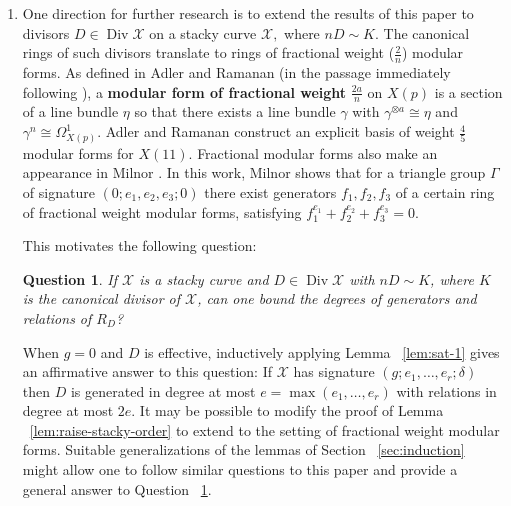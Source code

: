 \documentclass{amsart}
\theoremstyle{plain}
\newtheorem{question}[thm]{Question}
\theoremstyle{definition}
\theoremstyle{remark}
\numberwithin{equation}{section}
\DeclareMathOperator\di{Div}
\newcommand\sx{\mathscr X}
\begin{document}
\begin{enumerate}
	\item One direction for further research is to 
		extend the results of this paper to divisors $D \in \di \sx$ on a 
		stacky curve $\sx,$ where $nD \sim K.$ The canonical rings of such 
		divisors translate to rings of fractional weight ($\frac{2}{n}$) modular 
		forms. As defined in Adler and Ramanan (in the passage immediately 
		following \cite[Corollary 24.5]{adler:moduli}), a {\bf modular form 
		of fractional weight} $\frac{2a}{n}$ on $X(p)$ is a section of a 
		line bundle $\eta$ so that there exists a line bundle $\gamma$ with 
		$\gamma^{\otimes a} \cong \eta$ and $\gamma^{n} \cong \Omega_{X(p)}^
		1$. Adler and Ramanan \cite[Appendix 2]{adler:moduli} construct an 
		explicit basis of weight $\frac{4}{5}$ modular forms for $X(11)$. 
		Fractional modular forms also make an appearance in Milnor \cite[$
		\mathsection$ 6]{milnor:fractional-weight}. In this work, Milnor 
		shows that for a triangle group $\Gamma$ of signature $(0; e_1,e_2,e
		_3; 0)$ there exist generators $f_1,f_2,f_3$ of a certain ring of 
		fractional weight modular forms, satisfying $f_1^{e_1}+f_2^{e_2}+f_3
		^{e_3} = 0$.  

		This motivates the following question:

		\begin{question}
		\label{ques:fractional-weight}
			If $\sx$ is a stacky curve and $D \in \di \sx$ with $nD \sim K$, 
			where $K$ is the canonical divisor of $\sx$, can one bound the 
			degrees of generators and relations of $R_D$?
		\end{question}
		When $g=0$ and $D$ is effective, inductively applying Lemma ~\ref{lem:sat-1}  
		gives an affirmative answer to this question: If $\sx$ has signature 
		$(g;e_1, \ldots, e_r; \delta)$ then $D$ is generated in degree at 
		most $e = \max(e_1, \ldots, e_r)$ with relations in degree at most
		$2e$. 
		It may be possible to modify the proof of Lemma
		~\ref{lem:raise-stacky-order} to extend to the setting of fractional 
		weight modular forms. 
		Suitable generalizations of the 
		lemmas of Section ~\ref{sec:induction} might allow one to 
		follow similar questions to this paper and provide a general 
		answer to Question ~\ref{ques:fractional-weight}.



\end{enumerate}
\end{document}
